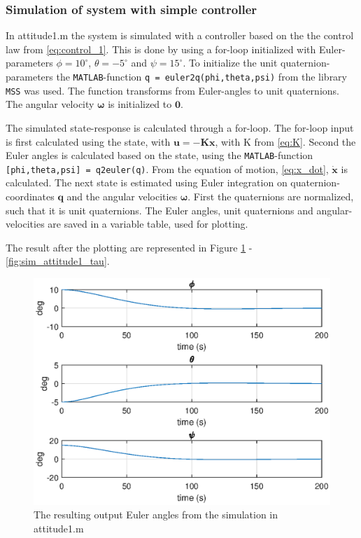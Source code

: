 \subsubsection*{Simulation of system with simple controller}

In {\color{blue}  attitude1.m } the system is simulated with a controller based on the the control law from \eqref{eq:control_1}. This is done by using a for-loop initialized with Euler-parameters $\phi = 10 ^\circ$, $\theta = -5 ^\circ$ and $\psi = 15  ^\circ$. To initialize the unit quaternion-parameters the \texttt{MATLAB}-function \texttt{q = euler2q(phi,theta,psi)} from the library \texttt{MSS} was used. The function transforms from Euler-angles to unit quaternions. The angular velocity $\boldsymbol{\omega}$ is initialized to $\mathbf{0}$. 
 
The simulated state-response is calculated through a for-loop. The for-loop input is first calculated using the state, with $\mathbf{u} = -\mathbf{K}\mathbf{x}$, with K from \eqref{eq:K}. Second the Euler angles is calculated based on the state, using the  \texttt{MATLAB}-function \texttt{[phi,theta,psi] = q2euler(q)}.  From the equation of motion, \eqref{eq:x_dot}, $\dot{\mathbf{x}}$ is calculated. The next state is estimated using Euler integration on quaternion-coordinates $\mathbf{q}$ and the angular velocities $\boldsymbol{\omega}$. First the quaternions are normalized, such that it is unit quaternions. The Euler angles, unit quaternions and angular-velocities are saved in a variable table, used for plotting.

The result after the plotting are represented in Figure \ref{fig:sim_attitude1_euler} - \ref{fig:sim_attitude1_tau}. 

\begin{figure}[!htb]
	\centering
	\includegraphics[width=1.00\textwidth]{figures/1_euler.eps}
	\caption{The resulting output Euler angles from the simulation in {\color{blue}attitude1.m}}
\label{fig:sim_attitude1_euler}
\end{figure}

